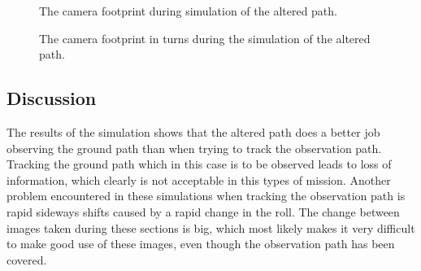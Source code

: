 \begin{figure}[!ht]
    \centering
    \caption{The camera footprint during simulation of the altered path.}
	\label{fig:both_camera_path}
\end{figure}

\begin{figure}[!ht]
    \centering
    \caption{The camera footprint in turns during the simulation of the altered path.}
	\label{fig:both_camera_turns}
\end{figure}


\subsection{Discussion}

The results of the simulation shows that the altered path does a better job observing the ground path than when trying to track the observation path. Tracking the ground path which in this case is to be observed leads to loss of information, which clearly is not acceptable in this types of mission. Another problem encountered in these simulations when tracking the observation path is rapid sideways shifts caused by a rapid change in the roll. The change between images taken during these sections is big, which most likely makes it very difficult to make good use of these images, even though the observation path has been covered.

